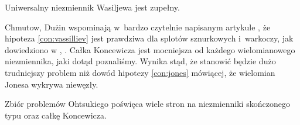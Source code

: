 \begin{conjecture}
    \label{con:vassilliev}
    Uniwersalny niezmiennik Wasiljewa jest zupełny.
\end{conjecture}

Chmutow, Dużin wspominają w~bardzo czytelnie napisanym artykule \cite{chmutov05}, że hipoteza \ref{con:vassilliev} jest prawdziwa dla splotów sznurkowych i~warkoczy, jak dowiedziono w \cite{kohno87}, \cite{barnatandror95}.
%
%
Całka Koncewicza jest mocniejsza od każdego wielomianowego niezmiennika, jaki dotąd poznaliśmy.
Wynika stąd, że stanowić będzie dużo trudniejszy problem niż dowód hipotezy \ref{con:jones} mówiącej, że wielomian Jonesa wykrywa niewęzły.

Zbiór problemów Ohtsukiego \cite[s. 398-444]{ohtsuki02} poświęca wiele stron na niezmienniki skończonego typu oraz całkę Koncewicza.



